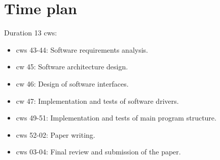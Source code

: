 %
%

\chapter{Time plan}
\label{chap:Time plan}
%
Duration 13 \acp{cw}:
\begin{itemize}
    \item \acsp{cw} 43-44: Software requirements analysis.
    \item \acs{cw} 45: Software architecture design.
    \item \acs{cw} 46: Design of software interfaces.
    \item \acs{cw} 47: Implementation and tests of software drivers.
    \item \acsp{cw} 49-51: Implementation and tests of main program structure.
    \item \acsp{cw} 52-02: Paper writing.
    \item \acsp{cw} 03-04: Final review and submission of the paper.
\end{itemize}